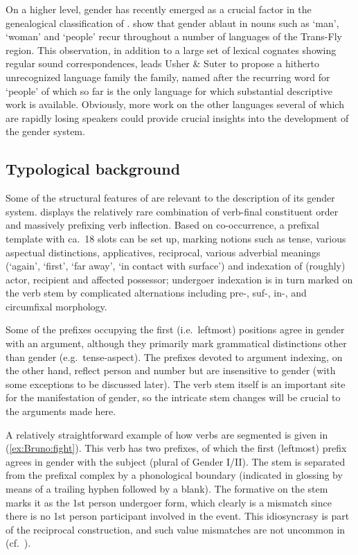 \documentclass[output=collectionpaper]{langsci/langscibook}
\begin{document}
On a higher level, gender has recently emerged as a crucial factor in the genealogical classification of . \textcite{Usher2015} show that gender ablaut in nouns such as  `man',  `woman' and  `people' recur throughout a number of languages of the Trans-Fly region. This observation, in addition to a large set of lexical cognates showing regular sound correspondences, leads Usher \& Suter to propose a hitherto unrecognized language family \textendash{} the  family, named after the recurring word for `people' \textendash{} of which  so far is the only language for which substantial descriptive work is available. Obviously, more work on the other  languages \textendash{} several of which are rapidly losing speakers \textendash{} could provide crucial insights into the development of the  gender system.

\subsection{Typological background}
\label{sec:Bruno:typology}
Some of the structural features of  are relevant to the description of its gender system.  displays the relatively rare combination of verb-final constituent order and massively prefixing verb inflection. Based on co-occurrence, a prefixal template with ca.~18 slots can be set up, marking notions such as tense, various aspectual distinctions, applicatives, reciprocal, various adverbial meanings (`again', `first', `far away', `in contact with surface') and indexation of (roughly) actor, recipient and affected possessor; undergoer indexation is in turn marked on the verb stem by complicated alternations including pre-, suf-, in-, and circumfixal morphology.

Some of the prefixes occupying the first (i.e.\ leftmost) positions agree in gender with an argument, although they primarily mark grammatical distinctions other than gender (e.g.\ tense-aspect). The prefixes devoted to argument indexing, on the other hand, reflect person and number but are insensitive to gender (with some exceptions to be discussed later). The verb stem itself is an important site for the manifestation of gender, so the intricate stem changes will be crucial to the arguments made here.

A relatively straightforward example of how verbs are segmented is given in (\ref{ex:Bruno:fight}). This verb has two prefixes, of which the first (leftmost) prefix agrees in gender with the subject (plural of Gender I/II). The stem is separated from the prefixal complex by a phonological boundary (indicated in glossing by means of a trailing hyphen followed by a blank). The formative  on the stem marks it as the 1st person undergoer form, which clearly is a mismatch since there is no 1st person participant involved in the event. This idiosyncrasy is part of the reciprocal construction, and such value mismatches are not uncommon in  (cf.\ ).
\end{document}
